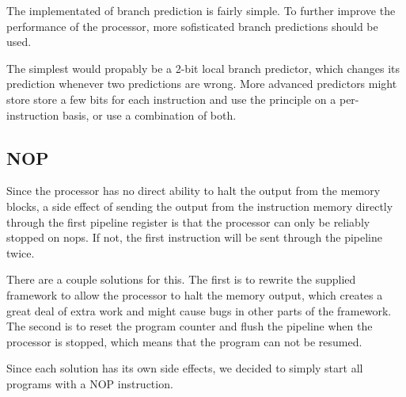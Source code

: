 The implementated of branch prediction is fairly simple. To further improve the
performance of the processor, more sofisticated branch predictions should be
used.

The simplest would propably be a 2-bit local branch predictor, which changes its prediction whenever two predictions are wrong.
More advanced predictors might store store a few bits for each instruction and use the principle on a per-instruction basis, or use a combination of both.

\subsection{NOP}

Since the processor has no direct ability to halt the output from the memory blocks, a side effect of sending the output from the instruction memory directly through the first pipeline register is that the processor can only be reliably stopped on nops.
If not, the first instruction will be sent through the pipeline twice.

There are a couple solutions for this.
The first is to rewrite the supplied framework to allow the processor to halt the memory output, which creates a great deal of extra work and might cause bugs in other parts of the framework.
The second is to reset the program counter and flush the pipeline when the processor is stopped, which means that the program can not be resumed.

Since each solution has its own side effects, we decided to simply start all
programs with a NOP instruction.

